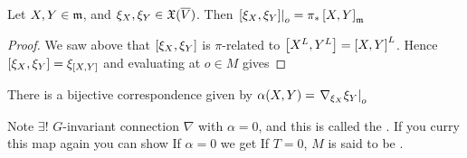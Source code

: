 \documentclass{article}
\begin{document}
\begin{lemma}
Let $X,Y \in \mf{m}$, and $\xi_X,\xi_Y \in \mf{X}(\overline{V})$. Then $\ev{\comm[\xi_X]{\xi_Y}}{o} = \pi_\ast \comm[X]{Y}_{\mf{m}}$
\end{lemma}
\begin{proof}
We saw above that $\comm[\xi_X]{\xi_Y}$ is $\pi$-related to $\comm[X^L]{Y^L} = \comm[X]{Y}^L$. Hence $\comm[\xi_X]{\xi_Y} = \xi_{\comm[X]{Y}}$ and evaluating at $o \in M$ gives 
\end{proof}

\begin{theorem}[Nomizu]
There is a bijective correspondence
given by 
$\alpha(X,Y) = \ev{\nabla_{\xi_X} \xi_Y}{o}
$
\end{theorem}
Note $\exists !$ $G$-invariant connection $\nabla$ with $\alpha=0$, and this is called the . If you curry this map again you can show 
If $\alpha=0$ we get 
If $T=0$, $M$ is said to be . 

\end{document}
